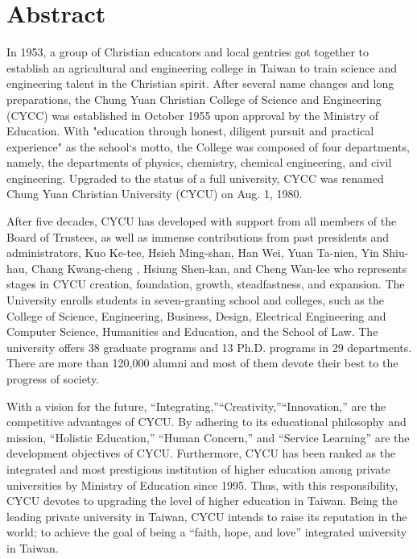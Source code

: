 \chapter{Abstract}
\label{ch:abstract}
In 1953, a group of Christian educators and local gentries got together to establish an agricultural and engineering college in Taiwan to train science and engineering talent in the Christian spirit. After several name changes and long preparations, the Chung Yuan Christian College of Science and Engineering (CYCC) was established in October 1955 upon approval by the Ministry of Education. With "education through honest, diligent pursuit and practical experience" as the school`s motto, the College was composed of four departments, namely, the departments of physics, chemistry, chemical engineering, and civil engineering. Upgraded to the status of a full university, CYCC was renamed Chung Yuan Christian University (CYCU) on Aug. 1, 1980. 
\par
After five decades, CYCU has developed with support from all members of the Board of Trustees, as well as immense contributions from past presidents and administrators, Kuo Ke-tee, Hsieh Ming-shan, Han Wei, Yuan Ta-nien, Yin Shiu-hau, Chang Kwang-cheng , Hsiung Shen-kan, and Cheng Wan-lee who represents stages in CYCU creation, foundation, growth, steadfastness, and expansion. The University enrolls students in seven-granting school and colleges, such as the College of Science, Engineering, Business, Design, Electrical Engineering and Computer Science, Humanities and Education, and the School of Law. The university offers 38 graduate programs and 13 Ph.D. programs in 29 departments. There are more than 120,000 alumni and most of them devote their best to the progress of society. 
\par
\clearpage
With a vision for the future, “Integrating,”“Creativity,”“Innovation,” are the competitive advantages of CYCU. By adhering to its educational philosophy and mission, “Holistic Education,” “Human Concern,” and “Service Learning” are the development objectives of CYCU. Furthermore, CYCU has been ranked as the integrated and most prestigious institution of higher education among private universities by Ministry of Education since 1995. Thus, with this responsibility, CYCU devotes to upgrading the level of higher education in Taiwan. Being the leading private university in Taiwan, CYCU intends to raise its reputation in the world; to achieve the goal of being a “faith, hope, and love” integrated university in Taiwan. 

